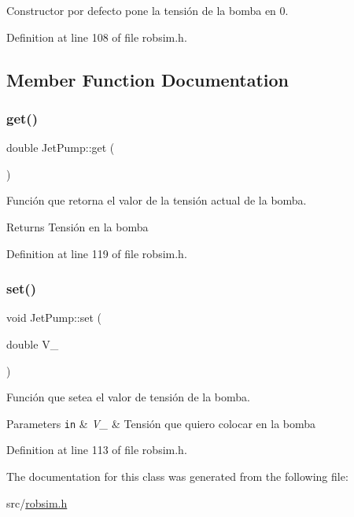 Constructor por defecto pone la tensión de la bomba en 0. 



Definition at line 108 of file robsim.\+h.



\subsection{Member Function Documentation}
\mbox{\label{classJetPump_adb125b513288b6783cc27fce155a6cb5}} 
\subsubsection{\texorpdfstring{get()}{get()}}
{\footnotesize\ttfamily double Jet\+Pump\+::get (\begin{DoxyParamCaption}{ }\end{DoxyParamCaption})\hspace{0.3cm}{\ttfamily [inline]}}



Función que retorna el valor de la tensión actual de la bomba. 

\begin{DoxyReturn}{Returns}
Tensión en la bomba 
\end{DoxyReturn}


Definition at line 119 of file robsim.\+h.

\mbox{\label{classJetPump_ab817ef3e43d409ffbce2b72583866000}} 
\subsubsection{\texorpdfstring{set()}{set()}}
{\footnotesize\ttfamily void Jet\+Pump\+::set (\begin{DoxyParamCaption}\item[{double}]{V\+\_\+ }\end{DoxyParamCaption})\hspace{0.3cm}{\ttfamily [inline]}}



Función que setea el valor de tensión de la bomba. 


\begin{DoxyParams}[1]{Parameters}
\mbox{\tt in}  & {\em V\+\_\+} & Tensión que quiero colocar en la bomba \\
\hline
\end{DoxyParams}


Definition at line 113 of file robsim.\+h.



The documentation for this class was generated from the following file\+:\begin{DoxyCompactItemize}
\item 
src/\hyperlink{robsim_8h}{robsim.\+h}\end{DoxyCompactItemize}
